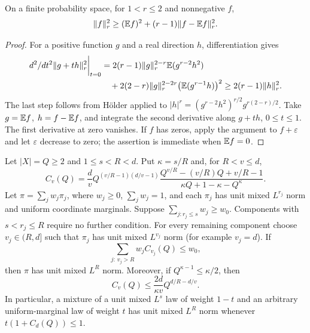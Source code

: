 \begin{lemma}\label{lem:density:uniform-convexity}
On a finite probability space, for $1<r\le2$ and nonnegative $f$,
\[
 \|f\|_r^2\ge(\mathbb E f)^2+(r-1)\|f-\mathbb E f\|_r^2.
\]
\end{lemma}
\begin{proof}
For a positive function $g$ and a real direction $h$, differentiation gives
\begin{align*}
 d^2/dt^2\|g+th\|_r^2\bigg|_{t=0}
 &=2(r-1)\|g\|_r^{2-r}\mathbb E(g^{r-2}h^2)\\
 &\quad+2(2-r)\|g\|_r^{2-2r}\bigl(\mathbb E(g^{r-1}h)\bigr)^2
 \ge2(r-1)\|h\|_r^2.
\end{align*}
The last step follows from H\"older applied to
$|h|^r=(g^{r-2}h^2)^{r/2}g^{r(2-r)/2}$.
Take $g=\mathbb E f$, $h=f-\mathbb E f$, and integrate the second derivative along
$g+th$, $0\le t\le1$. The first derivative at zero vanishes. If $f$ has
zeros, apply the argument to $f+\varepsilon$ and let $\varepsilon$ decrease
to zero; the assertion is immediate when $\mathbb E f=0$.
\end{proof}

\begin{lemma}\label{lem:density:typed-mixture}
Let $|X|=Q\ge2$ and $1\le s<R<d$. Put $\kappa=s/R$ and, for $R<v\le d$,
\[
 C_v(Q)=\frac d v Q^{(v/R-1)(d/v-1)}
 \frac{Q^{v/R}-(v/R)Q+v/R-1}
      {\kappa Q+1-\kappa-Q^\kappa}.
\]
Let $\pi=\sum_j w_j\pi_j$, where $w_j\ge0$, $\sum_jw_j=1$, and each
$\pi_j$ has unit mixed $L^{r_j}$ norm and uniform coordinate marginals.
Suppose $\sum_{j:r_j\le s}w_j\ge w_0$.
Components with $s<r_j\le R$ require no further condition. For every
remaining component choose $v_j\in(R,d]$ such that $\pi_j$ has unit mixed $L^{v_j}$ norm (for example $v_j=d$). If
\[
 \sum_{j:\,v_j>R}w_j C_{v_j}(Q)\le w_0,
\]
then $\pi$ has unit mixed $L^R$ norm. Moreover, if
$Q^{\kappa-1}\le\kappa/2$, then
\begin{equation}\label{eq:density:typed-mixture-coarse}
 C_v(Q)\le\frac{2d}{\kappa v}Q^{d/R-d/v}.
\end{equation}
In particular, a mixture of a unit mixed $L^s$ law of weight $1-t$ and
an arbitrary uniform-marginal law of weight $t$ has unit mixed $L^R$ norm
whenever $t(1+C_d(Q))\le1$.
\end{lemma}

